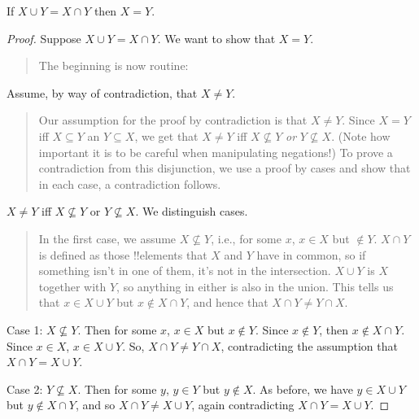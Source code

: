 \documentclass[../../../include/open-logic-section]{subfiles}
\begin{document}
\begin{prop}
If $X \cup Y = X \cap Y$ then $X = Y$.
\end{prop}

\begin{proof}
  Suppose $X \cup Y = X \cap Y$. We want to show that $X = Y$.
  \begin{quote}
    The beginning is now routine:
  \end{quote}
  Assume, by way of contradiction, that $X \neq Y$.
  \begin{quote}
    Our assumption for the proof by contradiction is that $X \neq
    Y$. Since $X = Y$ iff $X \subseteq Y$ an $Y \subseteq X$, we get
    that $X \neq Y$ iff $X \nsubseteq Y$ \emph{or} $Y \nsubseteq
    X$. (Note how important it is to be careful when manipulating
    negations!{}) To prove a contradiction from this disjunction, we
    use a proof by cases and show that in each case, a contradiction
    follows.
  \end{quote}
  $X \neq Y$ iff $X \nsubseteq Y$ or $Y \nsubseteq X$. We distinguish
  cases.
  \begin{quote}
    In the first case, we assume $X \nsubseteq Y$, i.e., for some $x$,
    $x \in X$ but $\notin Y$. $X \cap Y$ is defined as those
    !!{element}s that $X$ and $Y$ have in common, so if something
    isn't in one of them, it's not in the intersection. $X \cup Y$ is
    $X$ together with $Y$, so anything in either is also in the
    union. This tells us that $x \in X \cup Y$ but $x \notin X \cap
    Y$, and hence that $X \cap Y \neq Y \cap X$.
  \end{quote}
  
  Case 1: $X \nsubseteq Y$. Then for some $x$, $x \in X$ but $x \notin
  Y$. Since $x \notin Y$, then $x \notin X \cap Y$. Since $x \in X$,
  $x \in X \cup Y$. So, $X \cap Y \neq Y \cap X$, contradicting the
  assumption that $X \cap Y = X \cup Y$.

  Case 2: $Y \nsubseteq X$. Then for some $y$, $y \in Y$ but $y \notin
  X$. As before, we have $y \in X \cup Y$ but $y \notin X \cap Y$, and
  so $X \cap Y \neq X \cup Y$, again contradicting $X \cap Y = X \cup
  Y$. 
\end{proof}
\end{document}
